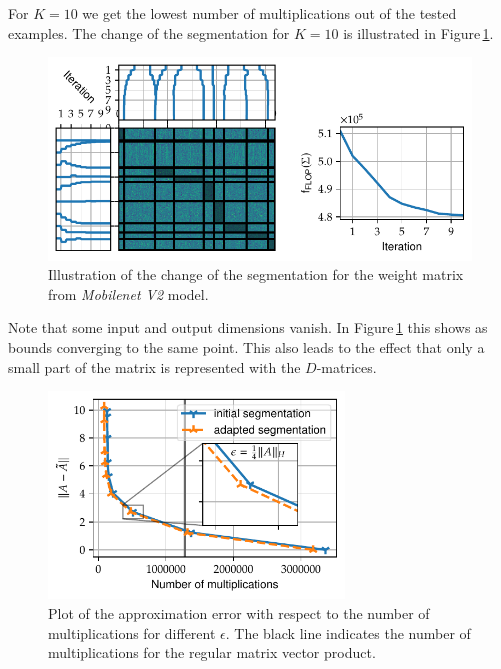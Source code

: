 \documentclass[doctype=mastersthesis,BCOR=15mm,biblatex]{ldvbook}%
\DeclareMathOperator{\f}{f}
\begin{document}
For $K=10$ we get the lowest number of multiplications out of the tested examples.
The change of the segmentation for $K=10$ is illustrated in Figure\,\ref{fig:mobilenet_seperation_comp}.
\begin{figure}[!htb]
	\centering
	\includegraphics[width=\textwidth]{Plots/move_example_mobilenet_comp.pdf}
	\caption{Illustration of the change of the segmentation for the weight matrix from \emph{Mobilenet V2} model.
	}
	\label{fig:mobilenet_seperation_comp}
\end{figure}
Note that some input and output dimensions vanish. 
In Figure\,\ref{fig:mobilenet_seperation_comp} this shows as bounds converging to the same point. This also leads to the effect that only a small part of the matrix is represented with the $D$-matrices.
\begin{figure}[!htb]
	\centering
	\includegraphics[width=0.7\textwidth]{Plots/move_example_mobilenet_error.pdf}
	\caption{Plot of the approximation error with respect to the number of multiplications for different $\epsilon$. 
	The black line indicates the number of multiplications for the regular matrix vector product. 
	}
	\label{fig:mobilenet_err_cost}
\end{figure}
\end{document}
